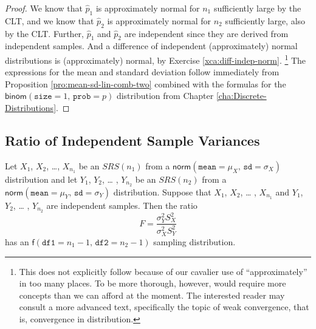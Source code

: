 \documentclass[captions=tableheading]{scrbook}
\begin{document}
\begin{proof}
We know that \(\hat{p}_{1}\) is approximately normal for \(n_{1}\) sufficiently large by the CLT, and we know that \(\hat{p}_{2}\) is approximately normal for \(n_{2}\) sufficiently large, also by the CLT. Further, \(\hat{p}_{1}\) and \(\hat{p}_{2}\) are independent since they are derived from independent samples. And a difference of independent (approximately) normal distributions is (approximately) normal, by Exercise \ref{xca:diff-indep-norm}.
\footnote{This does not explicitly follow because of our cavalier use of ``approximately'' in too many places. To be more thorough, however, would require more concepts than we can afford at the moment. The interested reader may consult a more advanced text, specifically the topic of weak convergence, that is, convergence in distribution.}
The expressions for the mean and standard deviation follow immediately from Proposition \ref{pro:mean-sd-lin-comb-two} combined with the formulas for the \(\mathsf{binom}(\mathtt{size}=1,\,\mathtt{prob}=p)\) distribution from Chapter \ref{cha:Discrete-Distributions}.
\end{proof}
\subsection{Ratio of Independent Sample Variances}
\label{sec-8-4-3}


\begin{prop}
Let \(X_{1}\), \(X_{2}\), \ldots{}, \(X_{n_{1}}\) be an \(SRS(n_{1})\) from a \(\mathsf{norm}(\mathtt{mean}=\mu_{X},\,\mathtt{sd}=\sigma_{X})\) distribution and let \(Y_{1}\), \(Y_{2}\), \ldots{} , \(Y_{n_{2}}\) be an \(SRS(n_{2})\) from a \(\mathsf{norm}(\mathtt{mean}=\mu_{Y},\,\mathtt{sd}=\sigma_{Y})\) distribution. Suppose that \(X_{1}\), \(X_{2}\), \ldots{} , \(X_{n_{1}}\) and \(Y_{1}\), \(Y_{2}\), \ldots{} , \(Y_{n_{2}}\) are independent samples. Then the ratio
\begin{equation}
F=\frac{\sigma_{Y}^{2}S_{X}^{2}}{\sigma_{X}^{2}S_{Y}^{2}}
\end{equation}
has an \(\mathsf{f}(\mathtt{df1}=n_{1}-1,\,\mathtt{df2}=n_{2}-1)\) sampling distribution.
\end{prop}
\end{document}
